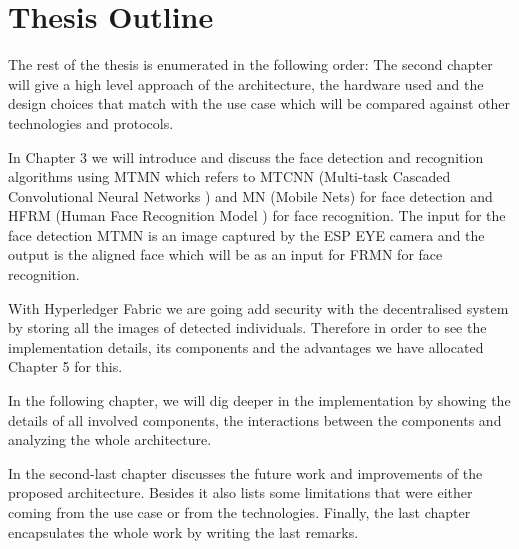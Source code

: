 \section{Thesis Outline}
The rest of the thesis is enumerated in the following order: The second chapter will give a high level approach of the architecture, the hardware used and the design choices that match with the use case which will be compared against other technologies and protocols.

In Chapter 3 we will introduce and discuss the face detection and recognition algorithms using MTMN which refers to MTCNN (Multi-task Cascaded Convolutional Neural Networks ) and MN (Mobile Nets) for face detection and HFRM (Human Face Recognition Model ) for face recognition. The input for the face detection MTMN is an image captured by the ESP EYE camera and the output is the aligned face which will be as an input for FRMN for face recognition. 

With Hyperledger Fabric we are going add security with the decentralised system by storing all the images of detected individuals. Therefore in order to see the implementation details, its components and the advantages we have allocated Chapter 5 for this. 

In the following chapter, we will dig deeper in the implementation by showing the details of all involved components, the interactions between the components and analyzing the whole architecture. 


In the second-last chapter discusses the future work and improvements of the proposed architecture. Besides  it also lists some limitations that were either coming from the use case or from the technologies. Finally, the last chapter encapsulates the whole work by writing the last remarks.




